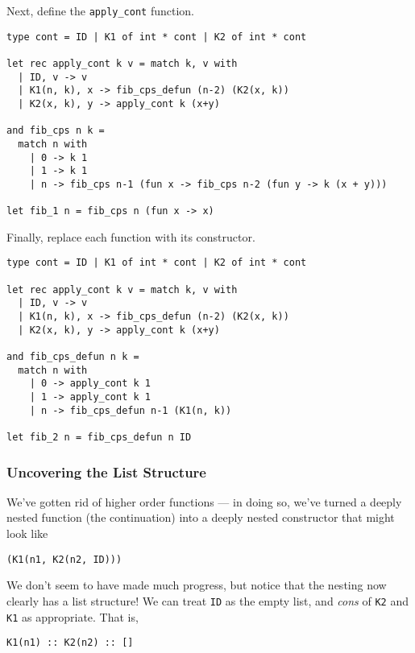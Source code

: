 Next, define the \texttt{apply\_cont} function. 

\begin{code}
\label{code:defun-fib-1}
\begin{verbatim}
type cont = ID | K1 of int * cont | K2 of int * cont

let rec apply_cont k v = match k, v with
  | ID, v -> v
  | K1(n, k), x -> fib_cps_defun (n-2) (K2(x, k))
  | K2(x, k), y -> apply_cont k (x+y)

and fib_cps n k = 
  match n with
    | 0 -> k 1
    | 1 -> k 1
    | n -> fib_cps n-1 (fun x -> fib_cps n-2 (fun y -> k (x + y)))

let fib_1 n = fib_cps n (fun x -> x)
\end{verbatim}
\end{code}

Finally, replace each function with its constructor. 

\begin{code}
\label{code:defun-fib-1}
\begin{verbatim}
type cont = ID | K1 of int * cont | K2 of int * cont

let rec apply_cont k v = match k, v with
  | ID, v -> v
  | K1(n, k), x -> fib_cps_defun (n-2) (K2(x, k))
  | K2(x, k), y -> apply_cont k (x+y)

and fib_cps_defun n k = 
  match n with
    | 0 -> apply_cont k 1
    | 1 -> apply_cont k 1
    | n -> fib_cps_defun n-1 (K1(n, k))

let fib_2 n = fib_cps_defun n ID
\end{verbatim}
\end{code}

\subsubsection{Uncovering the List Structure}
We've gotten rid of higher order functions --- in doing so, we've turned a deeply nested function (the continuation) into a deeply nested constructor that might look like
\begin{verbatim}
(K1(n1, K2(n2, ID)))
\end{verbatim}
We don't seem to have made much progress, but notice that the nesting now clearly has a list structure! We can treat \texttt{ID} as the empty list, and \emph{cons} of \texttt{K2} and \texttt{K1} as appropriate. That is, 
\begin{verbatim}
K1(n1) :: K2(n2) :: []
\end{verbatim}


